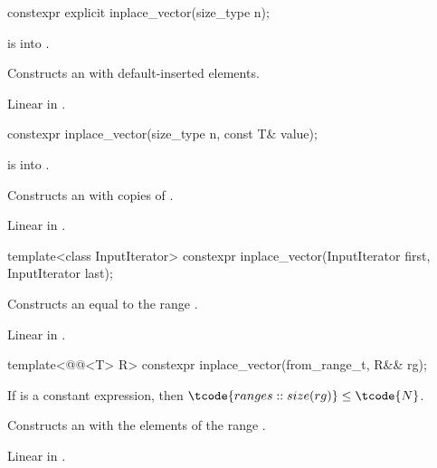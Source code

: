\begin{itemdecl}
constexpr explicit inplace_vector(size_type n);
\end{itemdecl}

\begin{itemdescr}
\pnum
\expects
{} is  into .

\pnum
\effects
Constructs an  with  default-inserted elements.

\pnum
\complexity
Linear in .
\end{itemdescr}

\begin{itemdecl}
constexpr inplace_vector(size_type n, const T& value);
\end{itemdecl}

\begin{itemdescr}
\pnum
\expects
{} is  into .

\pnum
\effects
Constructs an  with  copies of .

\pnum
\complexity
Linear in .
\end{itemdescr}

\begin{itemdecl}
template<class InputIterator>
  constexpr inplace_vector(InputIterator first, InputIterator last);
\end{itemdecl}

\begin{itemdescr}
\pnum
\effects
Constructs an  equal to the range .

\pnum
\complexity
Linear in .
\end{itemdescr}

\begin{itemdecl}
template<@@<T> R>
  constexpr inplace_vector(from_range_t, R&& rg);
\end{itemdecl}

\begin{itemdescr}
\pnum
\mandates
If  is a constant expression,
then $\tcode{ranges::size(rg)} \le \tcode{N}$.

\pnum
\effects
Constructs an  with
the elements of the range .

\pnum
\complexity
Linear in .
\end{itemdescr}


